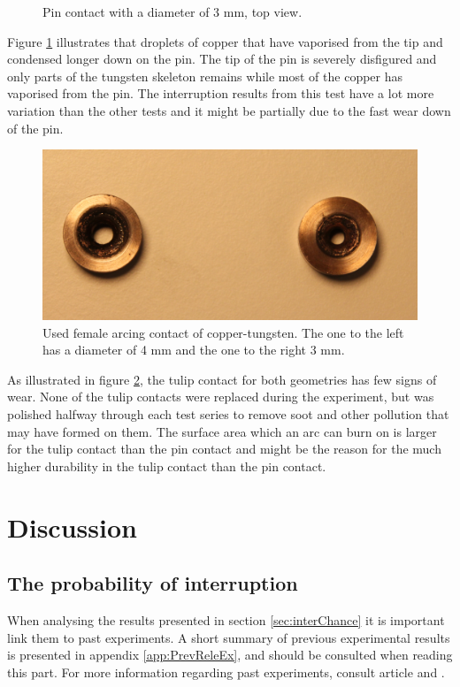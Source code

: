 \documentclass[10pt,a4paper,twoside]{article}
\begin{document}
\begin{figure}[H]
\begin{minipage}{.5\textwidth}
  \caption{Pin contact with a diameter of 3 mm, \newline top view.}
  \label{fig:d3_burn_top}
\end{minipage}
\end{figure}

Figure \ref{fig:d3_burn_top} illustrates that droplets of copper that have vaporised from the tip and condensed longer down on the pin. The tip of the pin is severely disfigured and only parts of the tungsten skeleton remains while most of the copper has vaporised from the pin. The interruption results from this test have a lot more variation than the other tests and it might be partially due to the fast wear down of the pin.  


\begin{figure}[H]
\centering
\includegraphics[scale=0.4]{Bilder/Discussion/femaleContacts4mmand3mm.png}
\caption{Used female arcing contact of copper-tungsten. The one to the left has a diameter of 4 mm and the one to the right 3 mm.} \label{fig:used_d4_d3_female}
\end{figure}

As illustrated in figure \ref{fig:used_d4_d3_female}, the tulip contact for both geometries has few signs of wear. None of the tulip contacts were replaced during the experiment, but was polished halfway through each test series to remove soot and other pollution that may have formed on them. The surface area which an arc can burn on is larger for the tulip contact than the pin contact and might be the reason for the much higher durability in the tulip contact than the pin contact.

\cleardoublepage

\section{Discussion}
\subsection{The probability of interruption} \label{sec:DiscIntChan}
When analysing the results presented in section \ref{sec:interChance} it is important link them to past experiments. A short summary of previous experimental results is presented in appendix \ref{app:PrevReleEx}, and should be consulted when reading this part. For more information regarding past experiments, consult article \cite{bib:CIAMVLBS} and \cite{bib:AFIMVLBA}.
\end{document}
